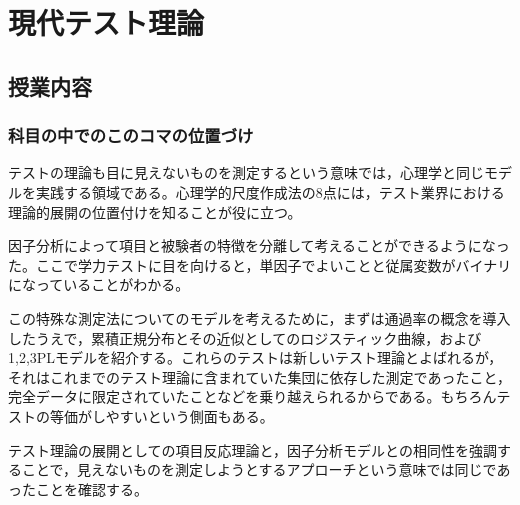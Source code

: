 \section{現代テスト理論}
\subsection{授業内容}
\subsubsection{科目の中でのこのコマの位置づけ}
テストの理論も目に見えないものを測定するという意味では，心理学と同じモデルを実践する領域である。心理学的尺度作成法の8点には，テスト業界における理論的展開の位置付けを知ることが役に立つ。

因子分析によって項目と被験者の特徴を分離して考えることができるようになった。ここで学力テストに目を向けると，単因子でよいことと従属変数がバイナリになっていることがわかる。

この特殊な測定法についてのモデルを考えるために，まずは通過率の概念を導入したうえで，累積正規分布とその近似としてのロジスティック曲線，および1,2,3PLモデルを紹介する。これらのテストは新しいテスト理論とよばれるが，それはこれまでのテスト理論に含まれていた集団に依存した測定であったこと，完全データに限定されていたことなどを乗り越えられるからである。もちろんテストの等価がしやすいという側面もある。

テスト理論の展開としての項目反応理論と，因子分析モデルとの相同性を強調することで，見えないものを測定しようとするアプローチという意味では同じであったことを確認する。

